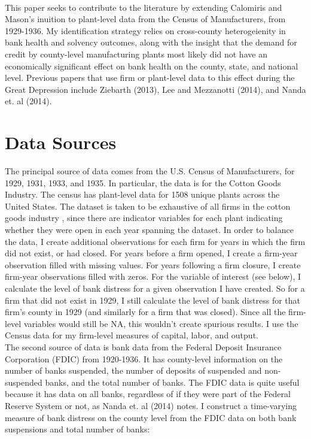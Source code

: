 \documentclass[letter,11pt]{article}
\begin{document}
{\\
\indent This paper seeks to contribute to the literature by extending Calomiris and Mason's inuition to plant-level data from the Census of Manufacturers, from 1929-1936. My identification strategy relies on cross-county heterogeienity in bank health and solvency outcomes, along with the insight that the demand for credit by county-level manufacturing plants most likely did not have an economically significant effect on bank health on the county, state, and national level. Previous papers that use firm or plant-level data to this effect during the Great Depression include Ziebarth (2013), Lee and Mezzanotti (2014), and Nanda et. al (2014). 

\section{Data Sources}
\indent The principal source of data comes from the U.S. Census of Manufacturers, for 1929, 1931, 1933, and 1935. In particular, the data is for the Cotton Goods Industry. The census has plant-level data for 1508 unique plants across the United States. The dataset is taken to be exhaustive of all firms in the cotton goods industry , since there are indicator variables for each plant indicating whether they were open in each year spanning the dataset. In order to balance the data, I create additional observations for each firm for years in which the firm did not exist, or had closed. For years before a firm opened, I create a firm-year observation filled with missing values. For years following a firm closure, I create firm-year observations filled with zeros. For the variable of interest (see below), I calculate the level of bank distress for a given observation I have created. So for a firm that did not exist in 1929, I still calculate the level of bank distress for that firm's county in 1929 (and similarly for a firm that was closed). Since all the firm-level variables would still be NA, this wouldn't create spurious results. I use the Census data for my firm-level measures of capital, labor, and output. 
\\
\indent The second source of data is bank data from the Federal Deposit Insurance Corporation (FDIC) from 1920-1936. It has county-level information on the number of banks suspended, the number of deposits of suspended and non-suspended banks, and the total number of banks. The FDIC data is quite useful because it has data on all banks, regardless of if they were part of the Federal Reserve System or not, as Nanda et. al (2014) notes. I construct a time-varying measure of bank distress on the county level from the FDIC data on both bank suspensions and total number of banks:
}
\end{document}
